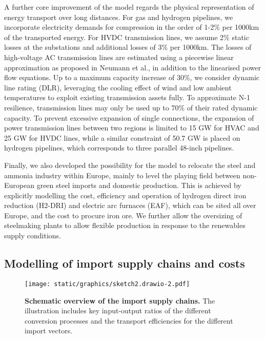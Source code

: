 A further core improvement of the model regards the physical representation of
energy transport over long distances. For gas and hydrogen pipelines, we
incorporate electricity demands for compression in the order of 1-2\% per 1000km
of the transported energy.\cite{gasforclimateEuropeanHydrogen2021} For HVDC
transmission lines, we assume 2\% static losses at the substations and
additional losses of 3\% per 1000km. The losses of high-voltage AC transmission
lines are estimated using a piecewise linear approximation as proposed in
Neumann et al.,\cite{neumannAssessmentsLinear2022} in addition to the linearised
power flow equations.\cite{horschLinearOptimal2018} Up to a maximum capacity
increase of 30\%, we consider dynamic line rating (DLR), leveraging the cooling
effect of wind and low ambient temperatures to exploit existing transmission
assets fully.\cite{glaumLeveragingExisting2023} To approximate N-1 resilience,
transmission lines may only be used up to 70\% of their rated dynamic capacity.
To prevent excessive expansion of single connections, the expansion of power
transmission lines between two regions is limited to 15 GW for HVAC and 25 GW
for HVDC lines, while a similar constraint of 50.7 GW is placed on hydrogen
pipelines, which corresponds to three parallel 48-inch
pipelines.\cite{gasforclimateEuropeanHydrogen2021}

Finally, we also developed the possibility for the model to relocate the steel
and ammonia industry within Europe, mainly to level the playing field between
non-European green steel imports and domestic production. This is achieved by
explicitly modelling the cost, efficiency and operation of hydrogen direct iron
reduction (H2-DRI) and electric arc furnaces (EAF), which can be sited all over
Europe, and the cost to procure iron ore. We further allow the oversizing of
steelmaking plants to allow flexible production in response to the renewables
supply conditions.

\subsection*{Modelling of import supply chains and costs}

\begin{figure*}
    \centering
    \texttt{[image: static/graphics/sketch2.drawio-2.pdf]}
    \caption{\textbf{Schematic overview of the import supply chains.} The
    illustration includes key input-output ratios of the different conversion
    processes and the transport efficiencies for the different import vectors.}
    \label{fig:import-esc-scheme}
\end{figure*}

